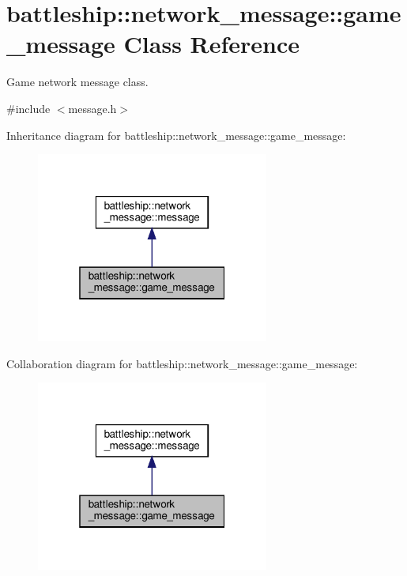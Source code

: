 \hypertarget{classbattleship_1_1network__message_1_1game__message}{}\section{battleship\+:\+:network\+\_\+message\+:\+:game\+\_\+message Class Reference}
\label{classbattleship_1_1network__message_1_1game__message}


Game network message class.  




{\ttfamily \#include $<$message.\+h$>$}



Inheritance diagram for battleship\+:\+:network\+\_\+message\+:\+:game\+\_\+message\+:
\nopagebreak
\begin{figure}[H]
\begin{center}
\leavevmode
\includegraphics[width=217pt]{classbattleship_1_1network__message_1_1game__message__inherit__graph}
\end{center}
\end{figure}


Collaboration diagram for battleship\+:\+:network\+\_\+message\+:\+:game\+\_\+message\+:
\nopagebreak
\begin{figure}[H]
\begin{center}
\leavevmode
\includegraphics[width=217pt]{classbattleship_1_1network__message_1_1game__message__coll__graph}
\end{center}
\end{figure}
